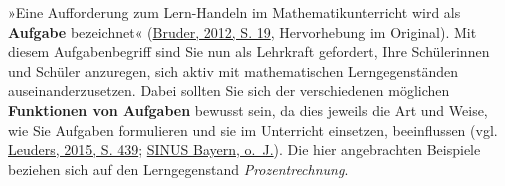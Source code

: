 \documentclass[
  ngerman,
]{scrbook}
\theoremstyle{definition}
\theoremstyle{definition}
\theoremstyle{definition}
\theoremstyle{definition}
\theoremstyle{remark}
\begin{document}
»Eine Aufforderung zum Lern-Handeln im Mathematikunterricht wird als \textbf{Aufgabe} bezeichnet« (\protect\hyperlink{ref-Bruder2012}{Bruder, 2012, S. 19}, Hervorhebung im Original). Mit diesem Aufgabenbegriff sind Sie nun als Lehrkraft gefordert, Ihre Schülerinnen und Schüler anzuregen, sich aktiv mit mathematischen Lerngegenständen auseinanderzusetzen. Dabei sollten Sie sich der verschiedenen möglichen \textbf{Funktionen von Aufgaben} bewusst sein, da dies jeweils die Art und Weise, wie Sie Aufgaben formulieren und sie im Unterricht einsetzen, beeinflussen (vgl. \protect\hyperlink{ref-Leuders2015}{Leuders, 2015, S. 439}; \protect\hyperlink{ref-SINUSBayern}{SINUS Bayern, o.~J.}). Die hier angebrachten Beispiele beziehen sich auf den Lerngegenstand \emph{Prozentrechnung}.
\end{document}
